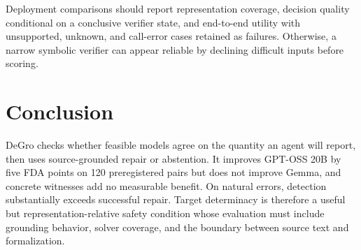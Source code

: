 \documentclass[sigconf,anonymous]{aamas}
\begin{document}
Deployment comparisons should report representation coverage, decision quality conditional on a conclusive verifier state, and end-to-end utility with unsupported, unknown, and call-error cases retained as failures.  Otherwise, a narrow symbolic verifier can appear reliable by declining difficult inputs before scoring.

\section{Conclusion}
DeGro checks whether feasible models agree on the quantity an agent will report, then uses source-grounded repair or abstention.  It improves GPT-OSS 20B by five FDA points on 120 preregistered pairs but does not improve Gemma, and concrete witnesses add no measurable benefit.  On natural errors, detection substantially exceeds successful repair.  Target determinacy is therefore a useful but representation-relative safety condition whose evaluation must include grounding behavior, solver coverage, and the boundary between source text and formalization.

\clearpage
\balance


\end{document}
